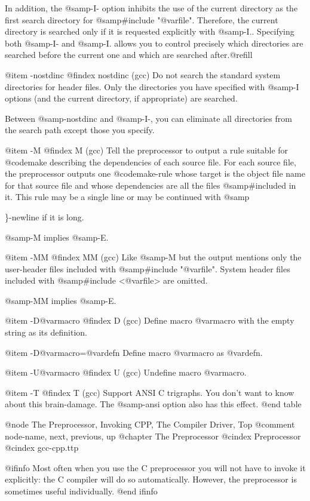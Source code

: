 {In addition, the @samp{-I-} option inhibits the use of the current
directory as the first search directory for @samp{#include
"@var{file}"}. Therefore, the current directory is searched only if
it is requested explicitly with @samp{-I.}. Specifying both
@samp{-I-} and @samp{-I.} allows you to control precisely which
directories are searched before the current one and which are searched
after.@refill

@item -nostdinc
@findex nostdinc (gcc)
Do not search the standard system directories for header files.  Only
the directories you have specified with @samp{-I} options (and the
current directory, if appropriate) are searched.

Between @samp{-nostdinc} and @samp{-I-}, you can eliminate all
directories from the search path except those you specify.

@item -M
@findex M (gcc)
Tell the preprocessor to output a rule suitable for @code{make}
describing the dependencies of each source file.  For each source
file, the preprocessor outputs one @code{make}-rule whose target is
the object file name for that source file and whose dependencies are
all the files @samp{#include}d in it. This rule may be a single line
or may be continued with @samp{\}-newline if it is long.

@samp{-M} implies @samp{-E}.

@item -MM
@findex MM (gcc)
Like @samp{-M} but the output mentions only the user-header files
included with @samp{#include "@var{file}"}. System header files
included with @samp{#include <@var{file}>} are omitted.

@samp{-MM} implies @samp{-E}.

@item -D@var{macro}
@findex D (gcc)
Define macro @var{macro} with the empty string as its definition.

@item -D@var{macro}=@var{defn}
Define macro @var{macro} as @var{defn}.

@item -U@var{macro}
@findex U (gcc)
Undefine macro @var{macro}.

@item -T
@findex T (gcc)
Support ANSI C trigraphs. You don't want to know about this
brain-damage. The @samp{-ansi} option also has this effect.
@end table

@node     The Preprocessor, Invoking CPP, The Compiler Driver, Top
@comment  node-name,        next,         previous,            up
@chapter The Preprocessor
@cindex Preprocessor
@cindex gcc-cpp.ttp

@ifinfo
Most often when you use the C preprocessor you will not have to invoke
it explicitly: the C compiler will do so automatically. However, the
preprocessor is sometimes useful individually.
@end ifinfo

}}
